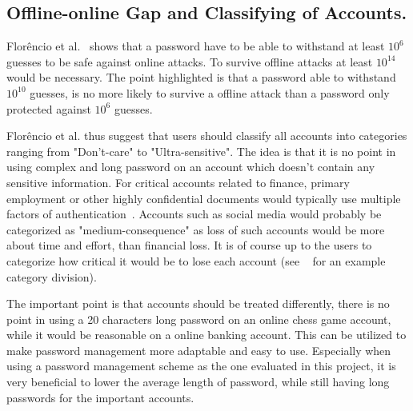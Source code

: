 \subsection{Offline-online Gap and Classifying of Accounts.}\label{classification} Florêncio et al.~\cite{guide-pws} shows that a password have to be able to withstand at least $10^6$ guesses to be safe against online attacks. To survive offline attacks at least $10^{14}$ would be necessary. The point highlighted is that a password able to withstand $10^{10}$ guesses, is no more likely to survive a offline attack than a password only protected against $10^6$ guesses. 
\par Florêncio et al. thus suggest that users should classify all accounts into categories ranging from "Don't-care" to "Ultra-sensitive". The idea is that it is no point in using complex and long password on an account which doesn't contain any sensitive information. For critical accounts related to finance, primary employment or other highly confidential documents would typically use multiple factors of authentication~\cite{2-factor-auth}. Accounts such as social media would probably be categorized as "medium-consequence" as loss of such accounts would be more about time and effort, than financial loss. It is of course up to the users to categorize how critical it would be to lose each account (see ~\cite{guide-pws} for an example category division). 
\par The important point is that accounts should be treated differently, there is no point in using a 20 characters long password on an online chess game account, while it would be reasonable on a online banking account. This can be utilized to make password management more adaptable and easy to use. Especially when using a password management scheme as the one evaluated in this project, it is very beneficial to lower the average length of password, while still having long passwords for the important accounts.



